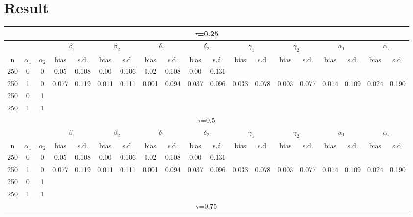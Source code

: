 \documentclass{article}
\begin{document}
\section{Result}

\small{
\begin{center}
\begin{sideways}
\begin{tabular}{ccccccccccccccccccc}
\hline
\multicolumn{19}{c}{$\tau$=0.25}\\
\hline
&&&\multicolumn{2}{c}{${\beta_1}$}&\multicolumn{2}{c}{${\beta_2}$}&\multicolumn{2}{c}{${\delta_1}$}&\multicolumn{2}{c}{${\delta_2}$}&\multicolumn{2}{c}{${\gamma_1}$}&\multicolumn{2}{c}{${\gamma_2}$}&\multicolumn{2}{c}{$\alpha_1$}&\multicolumn{2}{c}{$\alpha_2$}\\
n & $\alpha_1$ & $\alpha_2$ & bias & s.d. & bias & s.d.& bias & s.d.& bias & s.d.& bias & s.d. & bias & s.d. & bias & s.d. & bias & s.d. \\
250 & 0 & 0 & 0.05 & 0.108 & 0.00 & 0.106 & 0.02 & 0.108 & 0.00 & 0.131 & & & & & &&\\
250 & 1 & 0 & 0.077 & 0.119 & 0.011 & 0.111 & 0.001 & 0.094 & 0.037 & 0.096 & 0.033 & 0.078 & 0.003 & 0.077 & 0.014 & 0.109 & 0.024 & 0.190\\
250 & 0 & 1 & & & & & & & & & & & & & & & \\
250 & 1 & 1 & & & & & & & & & & & & & & & \\
\hline
\multicolumn{19}{c}{$\tau$=0.5}\\
\hline
&&&\multicolumn{2}{c}{${\beta_1}$}&\multicolumn{2}{c}{${\beta_2}$}&\multicolumn{2}{c}{${\delta_1}$}&\multicolumn{2}{c}{${\delta_2}$}&\multicolumn{2}{c}{${\gamma_1}$}&\multicolumn{2}{c}{${\gamma_2}$}&\multicolumn{2}{c}{$\alpha_1$}&\multicolumn{2}{c}{$\alpha_2$}\\
n & $\alpha_1$ & $\alpha_2$ & bias & s.d. & bias & s.d.& bias & s.d.& bias & s.d.& bias & s.d. & bias & s.d. & bias & s.d. & bias & s.d. \\
250 & 0 & 0 & 0.05 & 0.108 & 0.00 & 0.106 & 0.02 & 0.108 & 0.00 & 0.131 & & & & & &&\\
250 & 1 & 0 & 0.077 & 0.119 & 0.011 & 0.111 & 0.001 & 0.094 & 0.037 & 0.096 & 0.033 & 0.078 & 0.003 & 0.077 & 0.014 & 0.109 & 0.024 & 0.190\\
250 & 0 & 1 & & & & & & & & & & & & & & & \\
250 & 1 & 1 & & & & & & & & & & & & & & & \\
\hline
\multicolumn{19}{c}{$\tau$=0.75}\\

\end{tabular}
\end{sideways}
\end{center}}
\end{document}
